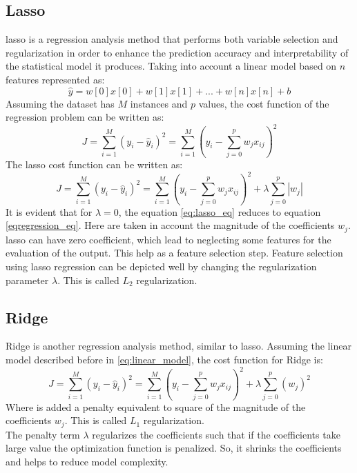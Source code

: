 \subsection{Lasso}
\gls{lasso} is a regression analysis method that performs both variable selection and regularization in order to enhance the prediction accuracy and interpretability of the statistical model it produces.
Taking into account a linear model based on $n$ features represented as:
\begin{equation}
	\hat{y}=w[0]x[0]+w[1]x[1]+...+w[n]x[n]+b
\end{equation}\label{linear_model}
Assuming the dataset has $M$ instances and $p$ values, the cost function of the regression problem can be written as:
\begin{equation}
	J=\sum_{i=1}^{M}{{(y_i-\hat{y}_i)}^2}=\sum_{i=1}^{M}{{ \left( y_i-\sum_{j=0}^{p}{w_jx_{ij}} \right) }^2}
\end{equation}\label{regression_eq}
The \gls{lasso} cost function can be written as:
\begin{equation}
	J=\sum_{i=1}^{M}{{(y_i-\hat{y}_i)}^2}=\sum_{i=1}^{M}{{ \left( y_i-\sum_{j=0}^{p}{w_jx_{ij}} \right) }^2}+\lambda \sum_{j=0}^{p}{|w_j|}
\end{equation}\label{lasso_eq}
It is evident that for $\lambda=0$, the equation \ref{eq:lasso_eq} reduces to equation \ref{eqregression_eq}. Here are taken in account the magnitude of the coefficients $w_j$.
\\
\gls{lasso} can have zero coefficient, which lead to neglecting some features for the evaluation of the output. This help as a feature selection step. Feature selection using \gls{lasso} regression can be depicted well by changing the regularization parameter $\lambda$. This is called $L_2$ regularization.

\subsection{Ridge}
Ridge is another regression analysis method, similar to \gls{lasso}. Assuming the linear model described before in \ref{eq:linear_model}, the cost function for Ridge is:
\begin{equation}
	J=\sum_{i=1}^{M}{{(y_i-\hat{y}_i)}^2}=\sum_{i=1}^{M}{{ \left( y_i-\sum_{j=0}^{p}{w_jx_{ij}} \right) }^2}+\lambda \sum_{j=0}^{p}{{(w_j)}^2}
\end{equation}\label{ridge_eq}
Where is added a penalty equivalent to square of the magnitude of the coefficients $w_j$. This is called $L_1$ regularization.
\\
The penalty term $\lambda$ regularizes the coefficients such that if the coefficients take large value the optimization function is penalized. So, it shrinks the coefficients and helps to reduce model complexity.

